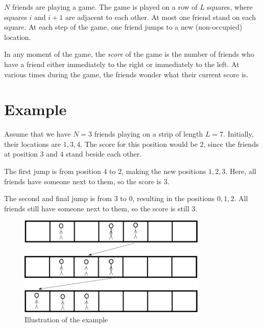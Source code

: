 \newcommand\version{v1}
$N$ friends are playing a game. The game is played on a row of $L$ squares, where squares $i$ and $i+1$ are adjacent to each other. At most one friend stand on each square.
At each step of the game, one friend jumps to a new (non-occupied) location.

In any moment of the game, the \emph{score} of the game is the number of friends who have a friend either
immediately to the right or immediately to the left. At various times during the game,
the friends wonder what their current score is.

\section*{Example}
Assume that we have $N = 3$ friends playing on a strip of length $L = 7$. Initially,
their locations are $1, 3, 4$. The score for this position would be $2$, since 
the friends at position $3$ and $4$ stand beside each other.

The first jump is from position $4$ to $2$, making the new positions $1, 2, 3$. Here, all friends
have someone next to them, so the score is $3$.

The second and final jump is from $3$ to $0$, resulting in the positions $0, 1, 2$. All friends
still have someone next to them, so the score is still $3$.

\begin{figure}[h!]
  \centering
  \includegraphics[width=0.8\textwidth]{sample.png}
  \caption{Illustration of the example}
\end{figure}

